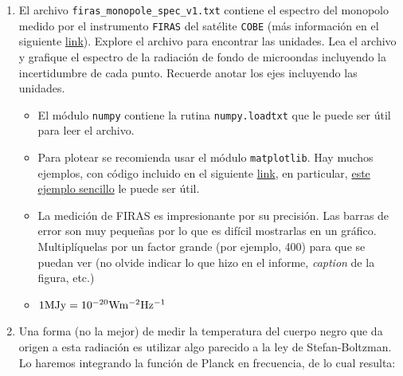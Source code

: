 \documentclass[letter, 11pt]{article}
\begin{document}
\begin{enumerate}
  
  \item El archivo \texttt{firas\_monopole\_spec\_v1.txt} contiene el espectro
    del monopolo medido por el instrumento \texttt{FIRAS} del satélite
    \texttt{COBE} (más información en el siguiente
    \href{https://lambda.gsfc.nasa.gov/product/cobe/firas_monopole_get.cfm}{link}).
    Explore el archivo para encontrar las unidades. Lea el archivo y grafique
    el espectro de la radiación de fondo de microondas incluyendo la
    incertidumbre de cada punto. Recuerde anotar los ejes incluyendo las unidades. 

    \begin{ayuda} 
      \small 
      \begin{itemize} 

        \item El módulo \texttt{numpy} contiene la rutina \texttt{numpy.loadtxt} que le puede
      ser útil para leer el archivo.  

        \item Para plotear se recomienda usar el módulo \texttt{matplotlib}.
          Hay muchos ejemplos, con código incluido en el siguiente
          \href{https://matplotlib.org/gallery.html}{link}, en particular,
          \href{https://matplotlib.org/examples/statistics/errorbar_demo.html}{este
          ejemplo sencillo} le puede ser útil.  

        \item La medición de FIRAS es impresionante por su precisión. Las
          barras de error son muy pequeñas por lo que es difícil mostrarlas en
          un gráfico. Multiplíquelas por un factor grande (por ejemplo, 400)
          para que se puedan ver (no olvide indicar lo que hizo en el informe,
          \emph{caption} de la figura, etc.)
        
        \item $1 {\rm MJy} = 10^{-20} {\rm W m^{-2} Hz^{-1}}$

      \end{itemize} 
    \end{ayuda}

  \item Una forma (no la mejor) de medir la temperatura del cuerpo negro que da
    origen a esta radiación es utilizar algo parecido a la ley de
    Stefan-Boltzman. Lo haremos integrando la función de Planck en frecuencia,
    de lo cual resulta:


\end{enumerate}
\end{document}
